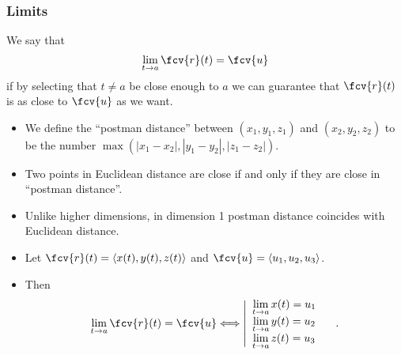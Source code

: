 
\begin{frame}
\frametitle{Limits}
\begin{definition}
We say that $$\lim_{t\to a} \fcv{r}(t) = \fcv{u}$$ if \alert<4>{ by selecting that } $t\neq a$ be close enough to $a$ \alert<5>{we can guarantee that $\fcv{r}(t)$} \alert<3>{is as close to $\fcv{u}$ as we want}.

\medskip

\end{definition}
\end{frame}

\begin{frame}
\begin{itemize}
\item We define the ``postman distance'' between $(x_1,y_1,z_1)$ and $(x_2, y_2, z_2)$ to be the number $\max(|x_1-x_2|, |y_1-y_2|, |z_1-z_2|) $.  
\item<2-> Two points in Euclidean distance are close if and only if they are close in ``postman distance''.
\item<3-> Unlike higher dimensions, in dimension 1 postman distance coincides with Euclidean distance.
\item<4-> Let $\fcv{r}(t) = \langle x(t), y(t), z(t) \rangle$ and $\fcv{u}=\langle u_1,u_2,u_3\rangle$.
\item<5-> Then     
\[
\lim_{t\to a} \fcv{r}(t) = \fcv{u} \Longleftrightarrow
\left|
\begin{array}{l}
\lim\limits_{t\to a} x(t) = u_1\\
\lim\limits_{t\to a} y(t) = u_2\\
\lim\limits_{t\to a} z(t) = u_3\\
\end{array} 
\right.\quad .
\]
\end{itemize}
\end{frame}